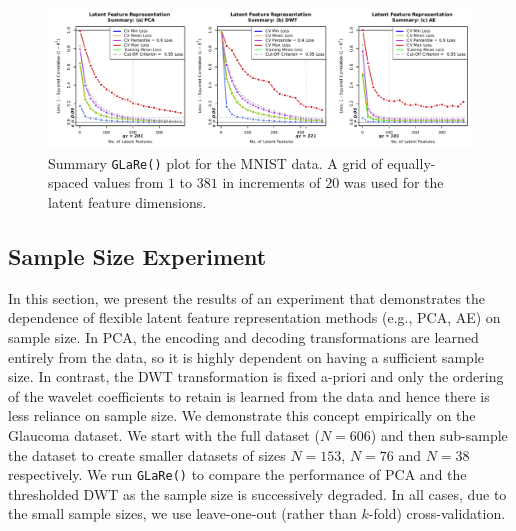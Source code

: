 \begin{figure}
    \centering
    \includegraphics[width=1\textwidth]{figures/mnist-results.pdf}
    \caption{Summary \texttt{GLaRe()} plot for the MNIST data. A grid of equally-spaced values from $1$ to $381$ in increments of $20$ was used for the latent feature dimensions.}
    \label{fig:mnist-results}
\end{figure}

\subsection{Sample Size Experiment}\label{sec:sample-size-experiment}

In this section, we present the results of an experiment that demonstrates the dependence of flexible latent feature representation methods (e.g., PCA, AE) on sample size.
In PCA, the encoding and decoding transformations are learned entirely from the data, so it is highly dependent on having a sufficient sample size.
In contrast, the DWT transformation is fixed a-priori and only the ordering of the wavelet coefficients to retain is learned from the data and hence there is less reliance on sample size.
We demonstrate this concept empirically on the Glaucoma dataset. 
We start with the full dataset ($N=606$) and then sub-sample the dataset to create smaller datasets of sizes $N=153$, $N=76$ and $N=38$ respectively.
We run \texttt{GLaRe()} to compare the performance of PCA and the thresholded DWT as the sample size is successively degraded.
In all cases, due to the small sample sizes, we use leave-one-out (rather than $k$-fold) cross-validation.

